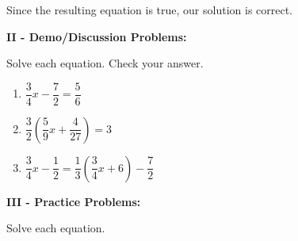 \documentclass[12pt]{article}
\theoremstyle{definition}
\begin{document}
Since the resulting equation is true, our solution is correct.\\
\par
{\bf II - Demo/Discussion Problems:}\\
\par
Solve each equation.  Check your answer.
\begin{enumerate}
	\item $\dfrac{3}{4}x-\dfrac{7}{2}=\dfrac{5}{6}$
	\item $\dfrac{3}{2}\left(\dfrac{5}{9}x+\dfrac{4}{27}\right)=3$
	\item $\dfrac{3}{4}x-\dfrac{1}{2}=\dfrac{1}{3}\left(\dfrac{3}{4}x+6\right)-\dfrac{7}{2}$
\end{enumerate}
{\bf III - Practice Problems:}\\
\par
Solve each equation.
\end{document}
